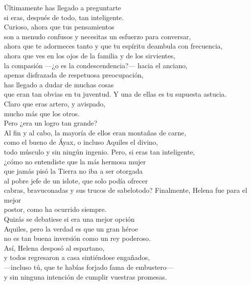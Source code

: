 \begin{versopropio}
Últimamente has llegado a preguntarte\\
si eras, después de todo, tan inteligente.\\
Curioso, ahora que tus pensamientos\\
son a menudo confusos y necesitas un esfuerzo para conversar,\\
ahora que te adormeces tanto y que tu espíritu deambula con frecuencia,\\
ahora que ves en los ojos de la familia y de los sirvientes,\\
la compasión ---¿o es la condescendencia?--- hacia el anciano,\\
apenas disfrazada de respetuosa preocupación,\\
has llegado a dudar de muchas cosas\\
que eran tan obvias en tu juventud.
\stanzabreak
Y una de ellas es tu supuesta astucia.\\
Claro que eras artero, y avispado,\\
mucho más que los otros.\\
Pero ¿era un logro tan grande?\\
Al fin y al cabo, la mayoría de ellos eran montañas de carne,\\
como el bueno de Áyax, o incluso Aquiles el divino,\\
todo músculo y sin ningún ingenio. Pero, si eras tan inteligente,\\
¿cómo no entendiste que la más hermosa mujer\\
que jamás pisó la Tierra no iba a ser otorgada\\
al pobre jefe de un islote, que solo podía ofrecer\\
cabras, bravuconadas y sus trucos de sabelotodo?
\stanzabreak
Finalmente, Helena fue para el mejor\\
postor, como ha ocurrido siempre.\\
Quizás se debatiese si era una mejor opción\\
Aquiles, pero la verdad es que un gran héroe\\
no es tan buena inversión como un rey poderoso.\\
Así, Helena desposó al espartano,\\
y todos regresaron a casa sintiéndose engañados,\\
---incluso tú, que te habías forjado fama de embustero---\\
y sin ninguna intención de cumplir vuestras promesas.
\end{versopropio}

